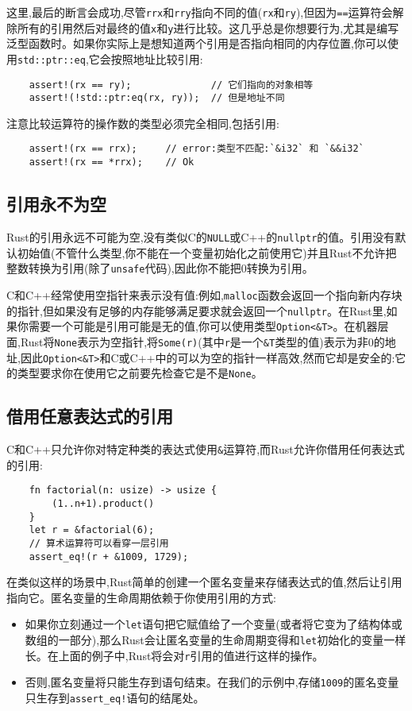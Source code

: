这里,最后的断言会成功,尽管\texttt{rrx}和\texttt{rry}指向不同的值(\texttt{rx}和\texttt{ry}),但因为\texttt{==}运算符会解除所有的引用然后对最终的值\texttt{x}和\texttt{y}进行比较。这几乎总是你想要行为,尤其是编写泛型函数时。如果你实际上是想知道两个引用是否指向相同的内存位置,你可以使用\texttt{std::ptr::eq},它会按照地址比较引用:
\begin{verbatim}
    assert!(rx == ry);              // 它们指向的对象相等
    assert!(!std::ptr:eq(rx, ry));  // 但是地址不同
\end{verbatim}

注意比较运算符的操作数的类型必须完全相同,包括引用:
\begin{verbatim}
    assert!(rx == rrx);     // error:类型不匹配:`&i32` 和 `&&i32`
    assert!(rx == *rrx);    // Ok
\end{verbatim}

\subsection{引用永不为空}
Rust的引用永远不可能为空,没有类似C的\texttt{NULL}或C++的\texttt{nullptr}的值。引用没有默认初始值(不管什么类型,你不能在一个变量初始化之前使用它)并且Rust不允许把整数转换为引用(除了\texttt{unsafe}代码),因此你不能把0转换为引用。

C和C++经常使用空指针来表示没有值:例如,\texttt{malloc}函数会返回一个指向新内存块的指针,但如果没有足够的内存能够满足要求就会返回一个\texttt{nullptr}。在Rust里,如果你需要一个可能是引用可能是无的值,你可以使用类型\texttt{Option<\&T>}。在机器层面,Rust将\texttt{None}表示为空指针,将\texttt{Some(r)}(其中\texttt{r}是一个\texttt{\&T}类型的值)表示为非0的地址,因此\texttt{Option<\&T>}和C或C++中的可以为空的指针一样高效,然而它却是安全的:它的类型要求你在使用它之前要先检查它是不是\texttt{None}。

\subsection{借用任意表达式的引用}
C和C++只允许你对特定种类的表达式使用\texttt{\&}运算符,而Rust允许你借用任何表达式的引用:
\begin{verbatim}
    fn factorial(n: usize) -> usize {
        (1..n+1).product()
    }
    let r = &factorial(6);
    // 算术运算符可以看穿一层引用
    assert_eq!(r + &1009, 1729);
\end{verbatim}

在类似这样的场景中,Rust简单的创建一个匿名变量来存储表达式的值,然后让引用指向它。匿名变量的生命周期依赖于你使用引用的方式:
\begin{itemize}
    \item 如果你立刻通过一个\texttt{let}语句把它赋值给了一个变量(或者将它变为了结构体或数组的一部分),那么Rust会让匿名变量的生命周期变得和\texttt{let}初始化的变量一样长。在上面的例子中,Rust将会对\texttt{r}引用的值进行这样的操作。
    \item 否则,匿名变量将只能生存到语句结束。在我们的示例中,存储\texttt{1009}的匿名变量只生存到\texttt{assert\_eq!}语句的结尾处。
\end{itemize}

